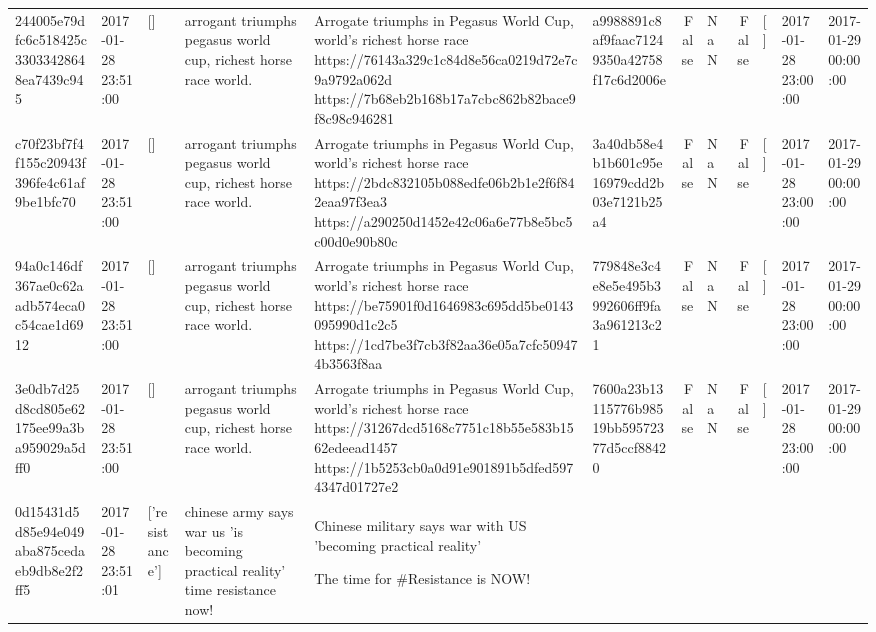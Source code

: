 \begin{tabular}{llllllrlrlll}
244005e79dfc6c518425c33033428648ea7439c945 & 2017-01-28 23:51:00 & [] & arrogant triumphs pegasus world cup, richest horse race world. & Arrogate triumphs in Pegasus World Cup, world's richest horse race https://76143a329c1c84d8e56ca0219d72e7c9a9792a062d https://7b68eb2b168b17a7cbc862b82bace9f8c98c946281 & a9988891c8af9faac71249350a42758f17c6d2006e & False & NaN & False & [] & 2017-01-28 23:00:00 & 2017-01-29 00:00:00 \\
c70f23bf7f4f155c20943f396fe4c61af9be1bfc70 & 2017-01-28 23:51:00 & [] & arrogant triumphs pegasus world cup, richest horse race world. & Arrogate triumphs in Pegasus World Cup, world's richest horse race https://2bdc832105b088edfe06b2b1e2f6f842eaa97f3ea3 https://a290250d1452e42c06a6e77b8e5bc5c00d0e90b80c & 3a40db58e4b1b601c95e16979cdd2b03e7121b25a4 & False & NaN & False & [] & 2017-01-28 23:00:00 & 2017-01-29 00:00:00 \\
94a0c146df367ae0c62aadb574eca0c54cae1d6912 & 2017-01-28 23:51:00 & [] & arrogant triumphs pegasus world cup, richest horse race world. & Arrogate triumphs in Pegasus World Cup, world's richest horse race https://be75901f0d1646983c695dd5be0143095990d1c2c5 https://1cd7be3f7cb3f82aa36e05a7cfc509474b3563f8aa & 779848e3c4e8e5e495b3992606ff9fa3a961213c21 & False & NaN & False & [] & 2017-01-28 23:00:00 & 2017-01-29 00:00:00 \\
3e0db7d25d8cd805e62175ee99a3ba959029a5dff0 & 2017-01-28 23:51:00 & [] & arrogant triumphs pegasus world cup, richest horse race world. & Arrogate triumphs in Pegasus World Cup, world's richest horse race https://31267dcd5168c7751c18b55e583b1562edeead1457 https://1b5253cb0a0d91e901891b5dfed5974347d01727e2 & 7600a23b13115776b98519bb59572377d5ccf88420 & False & NaN & False & [] & 2017-01-28 23:00:00 & 2017-01-29 00:00:00 \\
0d15431d5d85e94e049aba875cedaeb9db8e2f2ff5 & 2017-01-28 23:51:01 & ['resistance'] & chinese army says war us 'is becoming practical reality' time resistance now! & Chinese military says war with US 'becoming practical reality' 

The time for \#Resistance is NOW!  ✊🏻


\end{tabular}

